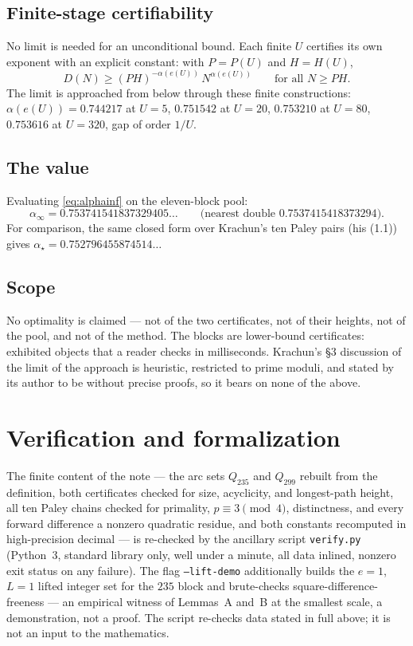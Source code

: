 \documentclass[11pt]{amsart}
\theoremstyle{plain}
\theoremstyle{remark}
\begin{document}
\subsection*{Finite-stage certifiability}
No limit is needed for an unconditional bound. Each finite $U$ certifies
its own exponent with an explicit constant: with $P = P(U)$ and $H = H(U)$,
\[
D(N) \ge (PH)^{-\alpha(e(U))} \, N^{\alpha(e(U))}
\qquad \text{for all } N \ge PH.
\]
The limit is approached from below through these finite constructions:
$\alpha(e(U)) = 0.744217$ at $U = 5$, $0.751542$ at $U = 20$, $0.753210$
at $U = 80$, $0.753616$ at $U = 320$, gap of order $1/U$.

\subsection*{The value}
Evaluating \eqref{eq:alphainf} on the eleven-block pool:
\[
\alpha_\infty = 0.753741541837329405\dots
\qquad \text{(nearest double } 0.7537415418373294\text{)}.
\]
For comparison, the same closed form over Krachun's ten Paley pairs
(his (1.1)) gives $\alpha_\star = 0.752796455874514\dots$

\subsection*{Scope}
No optimality is claimed --- not of the two certificates, not of their
heights, not of the pool, and not of the method. The blocks are lower-bound
certificates: exhibited objects that a reader checks in milliseconds.
Krachun's \S3 discussion of the limit of the approach is heuristic,
restricted to prime moduli, and stated by its author to be without precise
proofs, so it bears on none of the above.

\section{Verification and formalization}\label{sec:verification}

The finite content of the note --- the arc sets $Q_{235}$ and $Q_{299}$
rebuilt from the definition, both certificates checked for size, acyclicity,
and longest-path height, all ten Paley chains checked for primality,
$p \equiv 3 \pmod 4$, distinctness, and every forward difference a nonzero
quadratic residue, and both constants recomputed in high-precision
decimal --- is re-checked by the ancillary script \texttt{verify.py}
(Python~3, standard library only, well under a minute, all data inlined,
nonzero exit status on any failure). The flag \texttt{--lift-demo}
additionally builds the $e = 1$, $L = 1$ lifted integer set for the $235$
block and brute-checks square-difference-freeness --- an empirical witness
of Lemmas~A and~B at the smallest scale, a demonstration, not a proof. The
script re-checks data stated in full above; it is not an input to the
mathematics.
\end{document}

